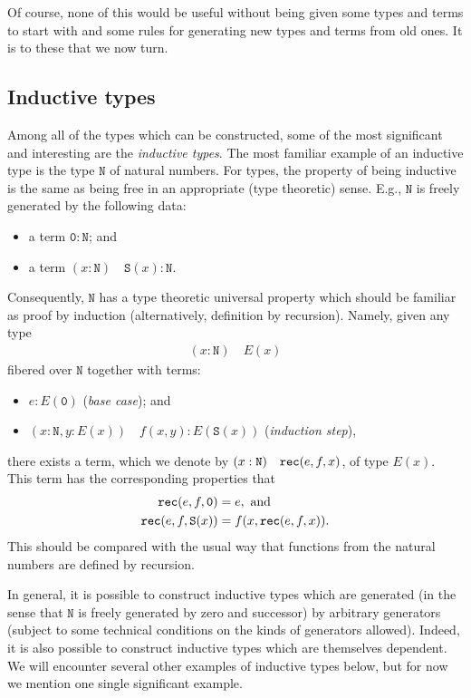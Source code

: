 \documentclass{amsart}
\newcommand{\nat}{\mathtt{N}}
\newcommand{\zero}{\mathtt{0}}
\newcommand{\successor}{\mathtt{S}}
\newcommand{\rec}{\textnormal{\texttt{rec}}}
\newcommand{\judge}[2]{(#1)\quad #2}
\theoremstyle{definition}
\theoremstyle{remark}
\numberwithin{equation}{section}
\begin{document}
Of course, none of this would be useful without being given some
types and terms to start with and some rules for generating new types and terms
from old ones.  It is to these that we now turn.

\subsection{Inductive types}\label{sec:inductive_intro}

Among all of the types which can be constructed, some of the most
significant and interesting are the \emph{inductive types}.  The most
familiar example of an inductive type is the type $\nat$ of natural
numbers.  For types, the property of being inductive is the same as
being free in an appropriate (type theoretic) sense.  E.g., $\nat$ is
freely generated by the following data:
\begin{itemize}
\item a term $\zero:\nat$; and
\item a term $\judge{x:\nat}{\successor(x):\nat}$.
\end{itemize}
Consequently, $\nat$ has a type theoretic universal property which
should be familiar as proof by induction (alternatively, definition by
recursion).  Namely, given any type 
\begin{align*}
  \judge{x:\nat}{E(x)}
\end{align*}
fibered over $\nat$ together with terms:
\begin{itemize}
\item $e:E(\zero)$ (\emph{base case}); and
\item $\judge{x:\nat,y:E(x)}{f(x,y):E(\successor(x))}$
  (\emph{induction step}),
\end{itemize}
there exists a term, which we denote by
$\judge{x:\nat}{\rec(e,f,x)}$, of type $E(x)$.  This term has
the corresponding properties that 
\begin{align*}
  \rec(e,f,\zero) & = e,\text{ and}\\
  \rec(e,f,\successor(x)) & = f(x,\rec(e,f,x)).
\end{align*}
This should be compared with the usual way that functions from the
natural numbers are defined by recursion.

In general, it is possible to construct inductive types which are
generated (in the sense that $\nat$ is freely generated by zero and
successor) by arbitrary generators (subject to some technical
conditions on the kinds of generators allowed).  Indeed, it is also
possible to construct inductive types which
are themselves dependent.  We will encounter several other examples of inductive
types below, but for now we mention one single significant example.
\end{document}
